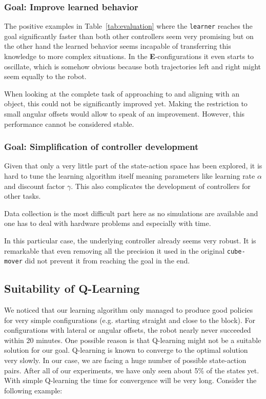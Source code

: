 \subsubsection{Goal: Improve learned behavior}
The positive examples in Table~\ref{tab:evaluation} where the \texttt{learner} reaches the goal significantly faster than both other controllers seem very promising but on the other hand the learned behavior seems incapable of transferring this knowledge to more complex situations. In the \textbf{E}-configurations it even starts to oscillate, which is somehow obvious because both trajectories left and right might seem equally to the robot.

When looking at the complete task of approaching to and aligning with an object, this could not be significantly improved yet. Making the restriction to small angular offsets would allow to speak of an improvement. However, this performance cannot be considered stable. 

\subsubsection{Goal: Simplification of controller development}
Given that only a very little part of the state-action space has been explored, it is hard to tune the learning algorithm itself meaning parameters like learning rate $\alpha$ and discount factor $\gamma$. This also complicates the development of controllers for other tasks.

Data collection is the most difficult part here as no simulations are available and one has to deal with hardware problems and especially with time.

In this particular case, the underlying controller already seems very robust. It is remarkable that even removing all the precision it used in the original \texttt{cube-mover} did not prevent it from reaching the goal in the end.

\subsection{Suitability of Q-Learning}
We noticed that our learning algorithm only managed to produce good policies for very simple configurations (e.g. starting straight and close to the block). For configurations with lateral or angular offsets, the robot nearly never succeeded within 20 minutes. One possible reason is that Q-learning might not be a suitable solution for our goal. Q-learning is known to converge to the optimal solution very slowly. In our case, we are facing a huge number of possible state-action pairs. After all of our experiments, we have only seen about 5\% of the states yet. With simple Q-learning the time for convergence will be very long. Consider the following example:

